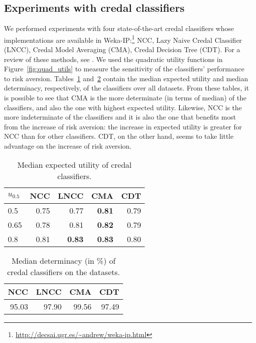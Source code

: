\documentclass[a4paper,10pt,reqno]{amsart}
\theoremstyle{remark}
\begin{document}

\subsection{Experiments with credal classifiers} \label{sec:credalclass}

We performed experiments with four state-of-the-art credal classifiers whose implementations are available in Weka-IP:\footnote{\url{http://decsai.ugr.es/~andrew/weka-ip.html}} NCC, Lazy Naive Credal Classifier (LNCC), Credal Model Averaging (CMA), Credal Decision Tree (CDT).
For a review of these methods, see \cite{itip}.
We used the quadratic utility functions in Figure~\ref{fig:quad_utils} to measure the sensitivity of the classifiers' performance to risk aversion. Tables~\ref{tab:medians} and~\ref{tab:determinacies} contain the median expected utility and median determinacy, respectively, of the classifiers over all datasets. From these tables, it is possible to see that CMA is the more determinate (in terms of median) of the classifiers, and also the one with highest expected utility. Likewise, NCC is the more indeterminate of the classifiers and it is also the one that benefits most from the increase of risk aversion: the increase in expected utility is greater for NCC than for other classifiers. CDT, on the other hand, seems to take little advantage on the increase of risk aversion.

\begin{table}[htp]
  \centering
  \begin{tabular}{lrrrr}
    \toprule
      $u_{0.5}$  &  NCC & LNCC & CMA & CDT\\ \midrule
    0.5 & 0.75 & 0.77 & \textbf{0.81} & 0.79\\
    0.65 & 0.78 & 0.81 & \textbf{0.82} & 0.79 \\
    0.8 & 0.81 & \textbf{0.83} & \textbf{0.83} & 0.80 \\ \bottomrule
  \end{tabular}
  \caption{Median expected utility of credal classifiers.}
  \label{tab:medians}
\end{table}

\begin{table}[htp]
  \centering
  \begin{tabular}{rrrr}
    \toprule
      NCC & LNCC & CMA & CDT\\ \midrule
      95.03 &  97.90 & 99.56 & 97.49 \\ \bottomrule
  \end{tabular}
  \caption{Median determinacy (in \%) of credal classifiers on the datasets.}
  \label{tab:determinacies}
\end{table}
\end{document}
